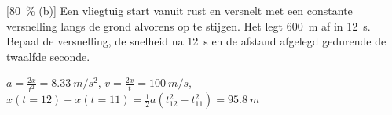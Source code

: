 

[\SI{80}{\percent} (b)] Een vliegtuig start vanuit rust en versnelt met een constante versnelling langs de grond alvorens op te stijgen. Het legt \SI{600}{m} af in \SI{12}{s}. Bepaal de versnelling, de snelheid na \SI{12}{s} en de afstand afgelegd gedurende de twaalfde seconde.

\begin{oplossing}
	$a=\frac{2x}{t^2}=\SI{8,33}{m/s^2}$,
	$v=\frac{2x}{t}=\SI{100}{m/s}$,
	$x(t=12)-x(t=11)=\frac{1}{2}a(t_{12}^2-t_{11}^2)=\SI{95,8}{m}$
\end{oplossing}
